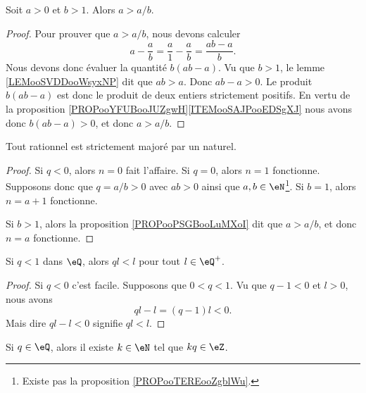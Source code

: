 \begin{proposition}	\label{PROPooPSGBooLuMXoI}
	Soit \( a>0\) et \( b>1\). Alors \( a>a/b\).
\end{proposition}

\begin{proof}
	Pour prouver que \( a>a/b\), nous devons calculer
	\begin{equation}
		a-\frac{ a }{ b }=\frac{ a }{ 1 }-\frac{ a }{ b }=\frac{ ab-a }{ b }.
	\end{equation}
	Nous devons donc évaluer la quantité \( b(ab-a)\). Vu que \( b>1\), le lemme \ref{LEMooSVDDooWsyxNP} dit que \( ab>a\). Donc \( ab-a>0\). Le produit \( b(ab-a)\) est donc le produit de deux entiers strictement positifs. En vertu de la proposition \ref{PROPooYFUBooJUZgwH}\ref{ITEMooSAJPooEDSgXJ} nous avons donc \( b(ab-a)>0\), et donc \( a>a/b\).
\end{proof}

\begin{lemma} \label{LEMooEBTIooGMoHsj}
	Tout rationnel est strictement majoré par un naturel.
\end{lemma}

\begin{proof}
	Si \( q<0\), alors \( n=0\) fait l'affaire. Si \( q=0\), alors \( n=1\) fonctionne. Supposons donc que \( q=a/b>0\) avec \( ab>0\) ainsi que \( a,b\in \eN\)\footnote{Existe pas la proposition \ref{PROPooTEREooZgblWu}.}. Si \( b=1\), alors \( n=a+1\) fonctionne.

	Si \( b>1\), alors la proposition \ref{PROPooPSGBooLuMXoI} dit que \( a>a/b\), et donc \( n=a\) fonctionne.
\end{proof}

\begin{proposition}     \label{PROPooBTCCooVVvaeL}
	Si \( q<1\) dans \( \eQ\), alors \( ql<l\) pour tout \( l\in \eQ^+\).
\end{proposition}

\begin{proof}
	Si \( q<0\) c'est facile. Supposons que \( 0<q<1\). Vu que \( q-1<0\) et \( l>0\), nous avons
	\begin{equation}
		ql-l=(q-1)l<0.
	\end{equation}
	Mais dire \( ql-l<0\) signifie \( ql<l\).
\end{proof}

\begin{lemma}		\label{LEMooMUYAooDLgDcf}
	Si \( q\in \eQ\), alors il existe \( k\in \eN\) tel que \( kq\in \eZ\).
\end{lemma}



